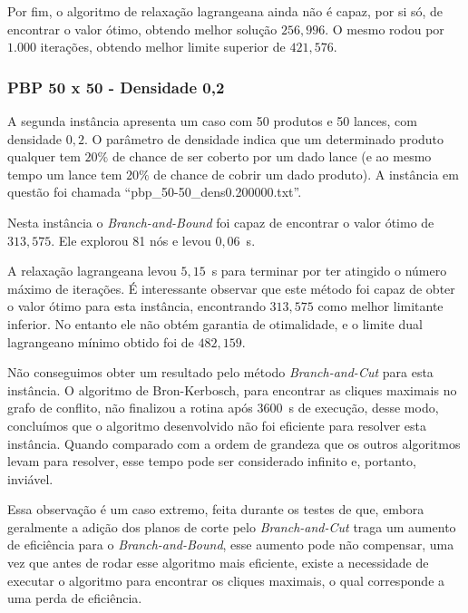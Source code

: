 \documentclass{article}
\begin{document}
    Por fim, o algoritmo de relaxação lagrangeana ainda não é capaz, por si só, de encontrar o valor ótimo, obtendo melhor solução $256{,}996$. O mesmo rodou por $1.000$ iterações, obtendo melhor limite superior de $421{,}576$.


    
    \subsubsection{PBP 50 x 50 - Densidade 0,2}
    
    
    A segunda instância apresenta um caso com 50 produtos e 50 lances, com densidade $0{,}2$. O parâmetro de densidade indica que um determinado produto qualquer tem $20\%$ de chance de ser coberto por um dado lance (e ao mesmo tempo um lance tem $20\%$ de chance de cobrir um dado produto). A instância em questão foi chamada \enquote{pbp\_50-50\_dens0.200000.txt}.
    
    Nesta instância o \emph{Branch-and-Bound} foi capaz de encontrar o valor ótimo de $313{,}575$. Ele explorou 81 nós e levou $0{,}06$~s. 
    
    A relaxação lagrangeana levou $5{,}15$~s para terminar por ter atingido o número máximo de iterações. É interessante observar que este método foi capaz de obter o valor ótimo para esta instância, encontrando $313{,}575$ como melhor limitante inferior. No entanto ele não obtém garantia de otimalidade, e o limite dual lagrangeano mínimo obtido foi de $482{,}159$.
    
    Não conseguimos
    obter um resultado pelo método \emph{Branch-and-Cut} para esta instância. O algoritmo de Bron-Kerbosch, para encontrar as cliques maximais no grafo de conflito, não finalizou a rotina após $3600$~s de execução, desse modo, concluímos que o algoritmo desenvolvido não foi eficiente para resolver esta instância. Quando comparado com a ordem de grandeza que os outros algoritmos levam para resolver, esse tempo pode ser considerado infinito e, portanto, inviável.
    
    Essa observação é um caso extremo, feita durante os testes de que, embora geralmente a adição dos planos de corte pelo \emph{Branch-and-Cut} traga um aumento de eficiência para o \emph{Branch-and-Bound}, esse aumento pode não compensar, uma vez que antes de rodar esse algoritmo mais eficiente, existe a necessidade de executar o algoritmo para encontrar os cliques maximais, o qual corresponde a uma perda de eficiência.
    
\end{document}
